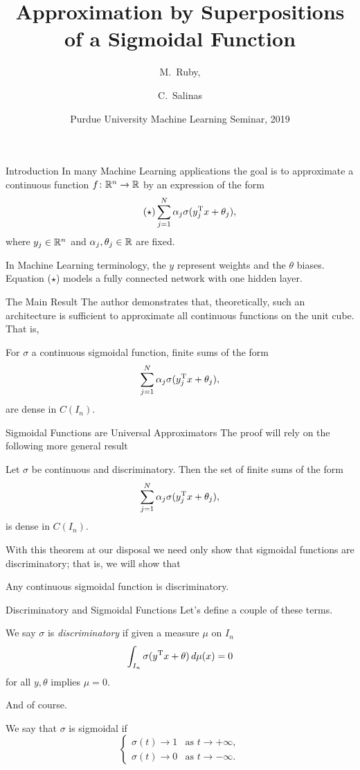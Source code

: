 \documentclass[11pt,letterpaper]{beamer}
\title[Approximation by a Sigmoidal Function] 
{Approximation by Superpositions of a Sigmoidal Function}
\author[M.\ Ruby, C.\ Salinas] 
{M.\ Ruby,%
  \and C.\ Salinas%
}
\institute[Purdue University] %
{
  Department of Mathematics\\
  Purdue University
 }
\date[Spring 2019] %
{Purdue University Machine Learning Seminar, 2019}
\begin{document}
\frame{\titlepage}

\begin{frame}{Introduction}
  In many Machine Learning applications the goal is to approximate a continuous
  function $f\colon\mathbb{R}^n\to\mathbb{R}$ by an expression of the form
  \begin{equation*}
    \tag{$\star$}
    \sum_{j=1}^N \alpha_j\sigma( y_j^{\mathrm{T}} x+\theta_j),
  \end{equation*}
  where $ y_j\in\mathbb{R}^n$ and $\alpha_j,\theta_j\in\mathbb{R}$ are fixed.

  In Machine Learning terminology, the $ y$ represent weights and the $\theta$
  biases. Equation ($\star$) models a fully connected network with one hidden
  layer.
\end{frame}

\begin{frame}{The Main Result}
  The author demonstrates that, theoretically, such an architecture is
  sufficient to approximate all continuous functions on the unit cube. That is,
  \begin{theorem}
    For $\sigma$ a continuous sigmoidal function, finite sums of the form
    \[
      \sum_{j=1}^N \alpha_j\sigma( y_j^{\mathrm{T}} x+\theta_j),
    \]
    are dense in $C(I_n)$.
  \end{theorem}
\end{frame}

\begin{frame}{Sigmoidal Functions are Universal Approximators}
  The proof will rely on the following more general result
  \begin{theorem}
    Let $\sigma$ be continuous and discriminatory. Then the set of finite sums
    of the form
    \[
      \sum_{j=1}^N \alpha_j\sigma( y_j^{\mathrm{T}} x+\theta_j),
    \]
    is dense in $C(I_n)$.
  \end{theorem}
  With this theorem at our disposal we need only show that sigmoidal functions
  are discriminatory; that is, we will show that
    \begin{lemma}
      Any continuous sigmoidal function is discriminatory.
  \end{lemma}
\end{frame}

\begin{frame}{Discriminatory and Sigmoidal Functions}
  Let's define a couple of these terms.
  \begin{definition}
    We say $\sigma$ is \emph{discriminatory} if given a measure $\mu$ on $I_n$
    \[
      \int_{I_n}\sigma( y^{\mathrm{T}} x+\theta)\mathop{}\!d\mu( x)=0
    \]
    for all $ y, \theta$ implies $\mu=0$.
  \end{definition}
  And of course.
  \begin{definition}
    We say that $\sigma$ is sigmoidal if
    \[
      \begin{cases}
        \sigma(t)\to 1&\text{as }t\to +\infty,\\
        \sigma(t)\to 0&\text{as }t\to -\infty.
      \end{cases}
    \]
  \end{definition}
\end{frame}
\end{document}
